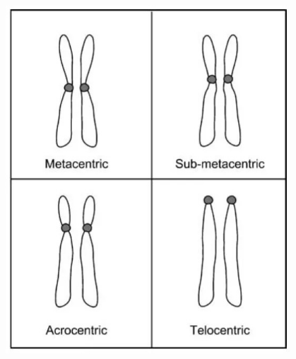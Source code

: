 \documentclass{beamer}
\begin{document}
\begin{frame}
\begin{columns}
\begin{column}{0.5\textwidth}
				\includegraphics[keepaspectratio, width  =0.8\textwidth]{img/chromosomeTypes} 
			\end{column}
			
		\end{columns}
		
	\end{frame}	
	
\end{document}
